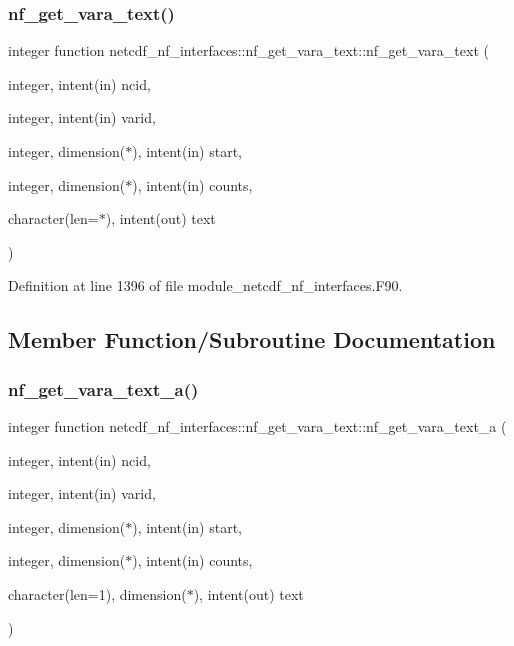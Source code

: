 \subsubsection{\texorpdfstring{nf\+\_\+get\+\_\+vara\+\_\+text()}{nf\_get\_vara\_text()}}
{\footnotesize\ttfamily integer function netcdf\+\_\+nf\+\_\+interfaces\+::nf\+\_\+get\+\_\+vara\+\_\+text\+::nf\+\_\+get\+\_\+vara\+\_\+text (\begin{DoxyParamCaption}\item[{integer, intent(in)}]{ncid,  }\item[{integer, intent(in)}]{varid,  }\item[{integer, dimension($\ast$), intent(in)}]{start,  }\item[{integer, dimension($\ast$), intent(in)}]{counts,  }\item[{character(len=$\ast$), intent(out)}]{text }\end{DoxyParamCaption})}



Definition at line 1396 of file module\+\_\+netcdf\+\_\+nf\+\_\+interfaces.\+F90.



\subsection{Member Function/\+Subroutine Documentation}
\mbox{\label{interfacenetcdf__nf__interfaces_1_1nf__get__vara__text_a334e07d2b108664bbc9265478b35eb04}} 
\subsubsection{\texorpdfstring{nf\+\_\+get\+\_\+vara\+\_\+text\+\_\+a()}{nf\_get\_vara\_text\_a()}}
{\footnotesize\ttfamily integer function netcdf\+\_\+nf\+\_\+interfaces\+::nf\+\_\+get\+\_\+vara\+\_\+text\+::nf\+\_\+get\+\_\+vara\+\_\+text\+\_\+a (\begin{DoxyParamCaption}\item[{integer, intent(in)}]{ncid,  }\item[{integer, intent(in)}]{varid,  }\item[{integer, dimension($\ast$), intent(in)}]{start,  }\item[{integer, dimension($\ast$), intent(in)}]{counts,  }\item[{character(len=1), dimension($\ast$), intent(out)}]{text }\end{DoxyParamCaption})}



